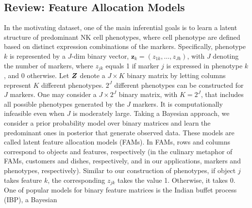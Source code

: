 \documentclass[12pt,]{article}
\newcommand{\bZ}{\mbox{\boldmath $Z$}}
\begin{document}
% 


\subsection{Review: Feature Allocation Models}\label{literature-review}
In the motivating dataset, one of the main inferential goals is  to learn a latent
structure of predominant NK cell phenotypes, where cell phenotype are defined based on
distinct expression combinations of the markers. Specifically, phenotype $k$ is
represented by a $J$-dim binary vector, $\bm z_k=(z_{1k}, \ldots, z_{Jk})$,
with $J$ denoting the number of markers, where $z_{jk}$ equals 1 if marker $j$
is expressed in phenotype $k$, and 0 otherwise.  Let $\bZ$ denote a $J \times
K$ binary matrix by letting columns represent $K$ different phenotypes.  \(2^J\) different
phenotypes can be constructed for \(J\) markers.  One may consider a \(J \times
2^J\) binary matrix, with $K=2^J$, that includes all possible phenotypes generated by the
\(J\) markers. It is computationally infeasible even when \(J\) is moderately
large. Taking a Bayesian approach, we consider a prior probability model over
binary matrices
and learn the predominant ones in posterior that  generate observed data.
These models are called latent feature allocation models (FAMs). In FAMs, rows 
and columns correspond to objects and features, respectively 
(in the culinary metaphor of FAMs, customers and dishes, respectively, and in
our applications, markers and phenotypes, respectively). Similar to our
construction of phenotypes, if object $j$ takes feature $k$, the corresponding
$z_{jk}$ takes the value 1. Otherwise, it takes 0.  One of popular models for
binary feature matrices is the Indian buffet process (IBP), a Bayesian
\end{document}
